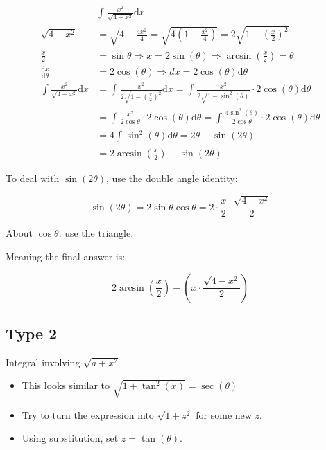 \documentclass[12pt]{article}
\theoremstyle{plain}
\theoremstyle{remark}
\theoremstyle{definition}
\begin{document}
\begin{align*}
&\int_{}^{}{\frac{x^{2}}{\sqrt{4 - x^{2}}}\text{d}x} \\
\sqrt{4 - x^{2}} &= \sqrt{4 - \frac{4x^{2}}{4}} = \sqrt{4\left( 1 - \frac{x^{2}}{4} \right)} = 2\sqrt{1 - \left( \frac{x}{2} \right)^{2}} \\
\frac{x}{2} &= \sin\theta \Rightarrow x = 2\sin(\theta) \Rightarrow \arcsin\left( \frac{x}{2} \right) = \theta \\
\frac{\text{d}x}{\text{d}\theta} &= 2\cos(\theta) \Rightarrow dx = 2\cos(\theta)\text{d}\theta \\
\int_{}^{}{\frac{x^{2}}{\sqrt{4 - x^{2}}}\text{d}x} &= \int_{}^{}{\frac{x^{2}}{2\sqrt{1 - \left( \frac{x}{2} \right)^{2}}}\text{d}x} = \int_{}^{}{\frac{x^{2}}{2\sqrt{1 - \sin^{2}(\theta)}} \cdot 2\cos(\theta)\text{d}\theta} \\
&= \int_{}^{}{\frac{x^{2}}{2\cos\theta} \cdot 2\cos(\theta)\text{d}\theta} = \int_{}^{}{\frac{4\sin^{2}(\theta)}{2\cos\theta} \cdot 2\cos(\theta)\text{d}\theta} \\
&= 4\int_{}^{}{\sin^{2}(\theta)\text{d}\theta} = 2\theta - \sin(2\theta) \\
&= 2\arcsin\left( \frac{x}{2} \right) - \sin(2\theta)
\end{align*}


To deal with \(\sin(2\theta)\), use the double angle identity:

\[\sin(2\theta) = 2\sin\theta\cos\theta = 2 \cdot \frac{x}{2} \cdot \frac{\sqrt{4 - x^{2}}}{2}\]

About \(\cos\theta\): use the triangle.


Meaning the final answer is:

\[2\arcsin\left( \frac{x}{2} \right) - \left( x \cdot \frac{\sqrt{4 - x^{2}}}{2} \right)\]


\subsection{Type 2}

Integral involving \(\sqrt{a + x^{2}}\)

\begin{itemize}
\item
  This looks similar to \(\sqrt{1 + \tan^{2}(x)} = \sec(\theta)\)
\item
  Try to turn the expression into \(\sqrt{1 + z^{2}}\) for some new
  \(z\).
\item
  Using substitution, set \(z = \tan(\theta)\).
\end{itemize}
\end{document}
